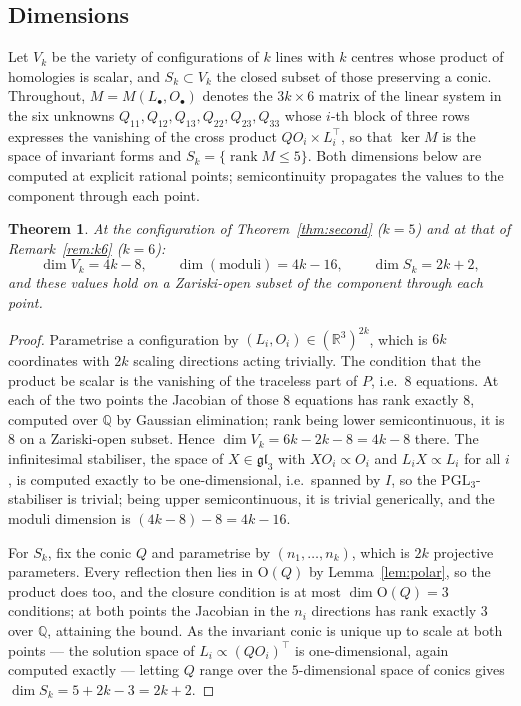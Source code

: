 \documentclass[11pt,a4paper]{article}
\theoremstyle{plain}
\newtheorem{theorem}{Theorem}[section]
\theoremstyle{definition}
\theoremstyle{remark}
\newcommand{\PGL}{\mathrm{PGL}}
\newcommand{\rk}{\operatorname{rank}}
\begin{document}
\subsection{Dimensions}

Let $V_k$ be the variety of configurations of $k$ lines with $k$ centres whose
product of homologies is scalar, and $S_k\subset V_k$ the closed subset of those
preserving a conic. Throughout, $M=M(L_\bullet,O_\bullet)$ denotes the
$3k\times6$ matrix of the linear system in the six unknowns
$Q_{11},Q_{12},Q_{13},Q_{22},Q_{23},Q_{33}$ whose $i$-th block of three rows
expresses the vanishing of the cross product $QO_i\times L_i^\top$, so that
$\ker M$ is the space of invariant forms and $S_k=\{\rk M\le5\}$. Both dimensions
below are computed at explicit rational points; semicontinuity propagates the
values to the component through each point.

\begin{theorem}\label{thm:dim}
At the configuration of Theorem~\ref{thm:second} \textup{(}$k=5$\textup{)} and at
that of Remark~\ref{rem:k6} \textup{(}$k=6$\textup{)}:
\[
  \dim V_k=4k-8,\qquad \dim(\text{moduli})=4k-16,\qquad \dim S_k=2k+2 ,
\]
and these values hold on a Zariski-open subset of the component through each point.
\end{theorem}

\begin{proof}
Parametrise a configuration by $(L_i,O_i)\in(\mathbb{R}^3)^{2k}$, which is $6k$
coordinates with $2k$ scaling directions acting trivially. The condition that the
product be scalar is the vanishing of the traceless part of $P$, i.e.\ $8$
equations. At each of the two points the Jacobian of those $8$ equations has rank
exactly $8$, computed over $\mathbb{Q}$ by Gaussian elimination; rank being lower
semicontinuous, it is $8$ on a Zariski-open subset. Hence $\dim V_k=6k-2k-8=4k-8$
there. The infinitesimal stabiliser, the space of $X\in\mathfrak{gl}_3$ with
$XO_i\propto O_i$ and $L_iX\propto L_i$ for all $i$, is computed exactly to be
one-dimensional, i.e.\ spanned by $I$, so the $\PGL_3$-stabiliser is trivial; being
upper semicontinuous, it is trivial generically, and the moduli dimension is
$(4k-8)-8=4k-16$.

For $S_k$, fix the conic $Q$ and parametrise by $(n_1,\dots,n_k)$, which is $2k$
projective parameters. Every reflection then lies in $\mathrm{O}(Q)$ by
Lemma~\ref{lem:polar}, so the product does too, and the closure condition is at
most $\dim\mathrm{O}(Q)=3$ conditions; at both points the Jacobian in the $n_i$
directions has rank exactly $3$ over $\mathbb{Q}$, attaining the bound. As the
invariant conic is unique up to scale at both points --- the solution space of
$L_i\propto(QO_i)^\top$ is one-dimensional, again computed exactly --- letting $Q$
range over the $5$-dimensional space of conics gives
$\dim S_k=5+2k-3=2k+2$.
\end{proof}
\end{document}

